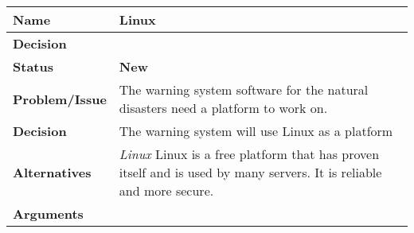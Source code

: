 \setcounter{DecisionNr}{0}

\begin{tabular}{L{} L{}}
    \textbf{Name} & \textbf{Linux} \\ \midrule
    \textbf{Decision} & \textbf{} \\ 
    \midrule \midrule
    \textbf{Status} & \textbf{New} \\ \midrule
    \textbf{Problem/Issue} & The warning system software for the natural disasters need a platform to work on.  \\ \midrule
    \textbf{Decision} &  The warning system will use Linux as a platform\\ \midrule
    \textbf{Alternatives} & \textit{Linux} \newline 
    Linux is a free platform that has proven itself and is used by many servers. It is reliable and more secure. \\ \midrule
    \textbf{Arguments} &  \\ \bottomrule
\end{tabular}